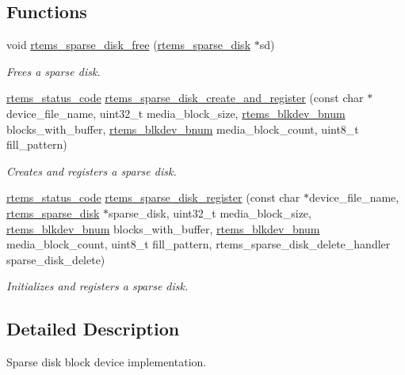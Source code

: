 \subsection*{Functions}
\begin{DoxyCompactItemize}
\item 
void \mbox{\hyperlink{group__rtems__sparse__disk_gae6a3909209876365980517aa319c7f87}{rtems\+\_\+sparse\+\_\+disk\+\_\+free}} (\mbox{\hyperlink{structrtems__sparse__disk}{rtems\+\_\+sparse\+\_\+disk}} $\ast$sd)
\begin{DoxyCompactList}\small\item\em Frees a sparse disk. \end{DoxyCompactList}\item 
\mbox{\hyperlink{group__ClassicStatus_ga545d41846817eaba6143d52ee4d9e9fe}{rtems\+\_\+status\+\_\+code}} \mbox{\hyperlink{group__rtems__sparse__disk_ga520bd068988717a02e0832c115760ef4}{rtems\+\_\+sparse\+\_\+disk\+\_\+create\+\_\+and\+\_\+register}} (const char $\ast$device\+\_\+file\+\_\+name, uint32\+\_\+t media\+\_\+block\+\_\+size, \mbox{\hyperlink{group__rtems__disk_ga5fbcfd40b657bff6c54d9e393fab3274}{rtems\+\_\+blkdev\+\_\+bnum}} blocks\+\_\+with\+\_\+buffer, \mbox{\hyperlink{group__rtems__disk_ga5fbcfd40b657bff6c54d9e393fab3274}{rtems\+\_\+blkdev\+\_\+bnum}} media\+\_\+block\+\_\+count, uint8\+\_\+t fill\+\_\+pattern)
\begin{DoxyCompactList}\small\item\em Creates and registers a sparse disk. \end{DoxyCompactList}\item 
\mbox{\hyperlink{group__ClassicStatus_ga545d41846817eaba6143d52ee4d9e9fe}{rtems\+\_\+status\+\_\+code}} \mbox{\hyperlink{group__rtems__sparse__disk_ga9c0612d8fec13b50359553e5efa15265}{rtems\+\_\+sparse\+\_\+disk\+\_\+register}} (const char $\ast$device\+\_\+file\+\_\+name, \mbox{\hyperlink{structrtems__sparse__disk}{rtems\+\_\+sparse\+\_\+disk}} $\ast$sparse\+\_\+disk, uint32\+\_\+t media\+\_\+block\+\_\+size, \mbox{\hyperlink{group__rtems__disk_ga5fbcfd40b657bff6c54d9e393fab3274}{rtems\+\_\+blkdev\+\_\+bnum}} blocks\+\_\+with\+\_\+buffer, \mbox{\hyperlink{group__rtems__disk_ga5fbcfd40b657bff6c54d9e393fab3274}{rtems\+\_\+blkdev\+\_\+bnum}} media\+\_\+block\+\_\+count, uint8\+\_\+t fill\+\_\+pattern, rtems\+\_\+sparse\+\_\+disk\+\_\+delete\+\_\+handler sparse\+\_\+disk\+\_\+delete)
\begin{DoxyCompactList}\small\item\em Initializes and registers a sparse disk. \end{DoxyCompactList}\end{DoxyCompactItemize}


\subsection{Detailed Description}
Sparse disk block device implementation. 

